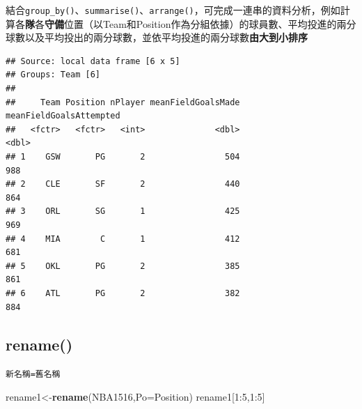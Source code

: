 \documentclass[]{book}
\newenvironment{Shaded}{\begin{snugshade}}{\end{snugshade}}
\newcommand{\KeywordTok}[1]{\textcolor[rgb]{0.13,0.29,0.53}{\textbf{{#1}}}}
\newcommand{\DataTypeTok}[1]{\textcolor[rgb]{0.13,0.29,0.53}{{#1}}}
\newcommand{\DecValTok}[1]{\textcolor[rgb]{0.00,0.00,0.81}{{#1}}}
\newcommand{\StringTok}[1]{\textcolor[rgb]{0.31,0.60,0.02}{{#1}}}
\newcommand{\NormalTok}[1]{{#1}}
\theoremstyle{definition}
\theoremstyle{definition}
\theoremstyle{remark}
\begin{document}
結合\texttt{group\_by()}、\texttt{summarise()}、\texttt{arrange()}，可完成一連串的資料分析，例如計算各\textbf{隊}各\textbf{守備}位置（以Team和Position作為分組依據）的球員數、平均投進的兩分球數以及平均投出的兩分球數，並依平均投進的兩分球數\textbf{由大到小排序}

\begin{Shaded}
\end{Shaded}

\begin{verbatim}
## Source: local data frame [6 x 5]
## Groups: Team [6]
## 
##     Team Position nPlayer meanFieldGoalsMade meanFieldGoalsAttempted
##   <fctr>   <fctr>   <int>              <dbl>                   <dbl>
## 1    GSW       PG       2                504                     988
## 2    CLE       SF       2                440                     864
## 3    ORL       SG       1                425                     969
## 4    MIA        C       1                412                     681
## 5    OKL       PG       2                385                     861
## 6    ATL       PG       2                382                     884
\end{verbatim}

\subsection{rename()}\label{rename}

\texttt{新名稱=舊名稱}

\begin{Shaded}
\begin{Highlighting}[]
\NormalTok{rename1<-}\KeywordTok{rename}\NormalTok{(NBA1516,}\DataTypeTok{Po=}\NormalTok{Position)}
\NormalTok{rename1[}\DecValTok{1}\NormalTok{:}\DecValTok{5}\NormalTok{,}\DecValTok{1}\NormalTok{:}\DecValTok{5}\NormalTok{]}
\end{Highlighting}
\end{Shaded}
\end{document}
